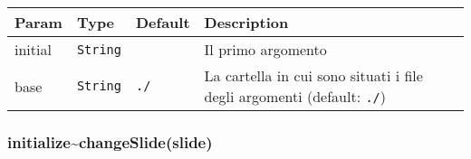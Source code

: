 \begin{tabularx}{\textwidth}{XXXX}
\toprule
\begin{minipage}[b]{0.22\columnwidth}\raggedright
Param\strut
\end{minipage} & \begin{minipage}[b]{0.22\columnwidth}\raggedright
Type\strut
\end{minipage} & \begin{minipage}[b]{0.22\columnwidth}\raggedright
Default\strut
\end{minipage} & \begin{minipage}[b]{0.22\columnwidth}\raggedright
Description\strut
\end{minipage}\tabularnewline
\midrule
\endhead
\begin{minipage}[t]{0.22\columnwidth}\raggedright
initial\strut
\end{minipage} & \begin{minipage}[t]{0.22\columnwidth}\raggedright
\texttt{String}\strut
\end{minipage} & \begin{minipage}[t]{0.22\columnwidth}\raggedright
\strut
\end{minipage} & \begin{minipage}[t]{0.22\columnwidth}\raggedright
Il primo argomento\strut
\end{minipage}\tabularnewline
\begin{minipage}[t]{0.22\columnwidth}\raggedright
base\strut
\end{minipage} & \begin{minipage}[t]{0.22\columnwidth}\raggedright
\texttt{String}\strut
\end{minipage} & \begin{minipage}[t]{0.22\columnwidth}\raggedright
\texttt{./}\strut
\end{minipage} & \begin{minipage}[t]{0.22\columnwidth}\raggedright
La cartella in cui sono situati i file degli argomenti (default:
\texttt{./})\strut
\end{minipage}\tabularnewline
\bottomrule
\end{tabularx}

\protect\hypertarget{initialize..changeSlide}{}{}

\hypertarget{initializechangeslideslide}{%
\subsubsection{initialize\textasciitilde{}changeSlide(slide)}\label{initializechangeslideslide}}

